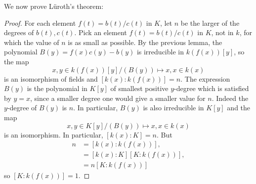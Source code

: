 We now prove L\"uroth's theorem:
\begin{proof}
For each element \(f(t)=b(t)/c(t)\) in \(K\), let \(n\) be the  larger of the degrees of \(b(t),c(t)\).
Pick an element \(f(t)=b(t)/c(t)\) in \(K\), not in \(k\), for which the value of \(n\) is as small as possible.
By the previous lemma, the polynomial \(B(y)=f(x)c(y)-b(y)\) is irreducible in \(k(f(x))[y]\), so the map
\[
x,y \in k(f(x))[y]/(B(y)) \mapsto x,x \in k(x)
\]
is an isomorphism of fields and \([k(x):k(f(x))]=n\).
The expression \(B(y)\) is the polynomial in \(K[y]\) of smallest positive \(y\)-degree which is satisfied by \(y=x\), since a smaller degree one would give a smaller value for \(n\).
Indeed the \(y\)-degree of \(B(y)\) is \(n\).
In particular, \(B(y)\) is also irreducible in \(K[y]\) and the map
\[
x,y \in K[y]/(B(y)) \mapsto x,x \in k(x)
\]
is an isomorphism.
In particular, \([k(x):K]=n\).
But
\begin{align*}
n
&=[k(x):k(f(x))],
\\
&=[k(x):K][K:k(f(x))],
\\
&=n[K:k(f(x))]
\end{align*}
so \([K:k(f(x))]=1\).
\end{proof}
   
   